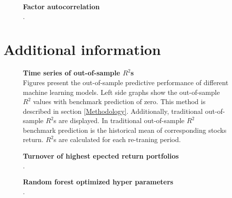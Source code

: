 \documentclass{article}
\begin{document}
\begin{figure}[ht]
\centering
\caption[Factor autocorrelation]{\textbf{Factor autocorrelation}\\ .}

\label{plot:factor_autocorrelation}
\end{figure}

\clearpage

\section{Additional information}
\renewcommand{\thefigure}{C.\arabic{figure}}
\setcounter{figure}{0}
\renewcommand{\thetable}{C.\arabic{table}}
\setcounter{table}{0}

\begin{figure}[ht]
\centering
\caption[Time series of out-of-sample $R^2$]{\textbf{Time series of out-of-sample \boldmath$R^2$s}\\ Figures present the out-of-sample predictive performance of different machine learning models. Left side graphs show the out-of-sample $R^2$ values with benchmark prediction of zero. This method is described in section \ref{Methodology}. Additionally, traditional out-of-sample $R^2$s are displayed. In traditional out-of-sample $R^2$ benchmark prediction is the historical mean of corresponding stocks return. $R^2$s are calculated for each re-traning period.}

\label{plot:OOSR2_ts}
\end{figure}

\begin{figure}[ht]
\centering
\caption[Turnover of highest epected return portfolios]{\textbf{Turnover of highest epected return portfolios}\\ .}

\label{plot:Turnover}
\end{figure}

\begin{figure}[ht]
\centering
\caption[Optimized random forest hyperparameters]{\textbf{Random forest optimized hyper parameters}\\ .}

\label{plot:RFHyperParams}
\end{figure}

\clearpage


\end{document}

